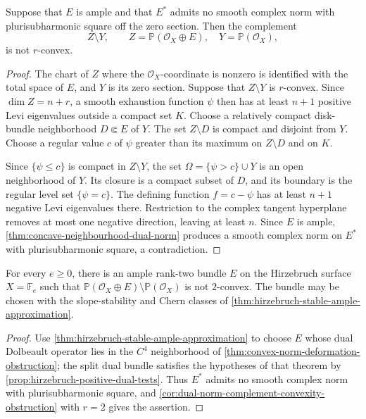 \begin{corollary}\label{cor:dual-norm-complement-convexity-obstruction}
Suppose that $E$ is ample and that $E^*$ admits no smooth complex norm with plurisubharmonic square off the zero section. Then the complement
\[
 Z\setminus Y,\qquad Z=\mathbb P(\mathcal O_X\oplus E),
 \quad Y=\mathbb P(\mathcal O_X),
\]
is not $r$-convex.
\end{corollary}
\begin{proof}
The chart of $Z$ where the $\mathcal O_X$-coordinate is nonzero is identified with the total space of $E$, and $Y$ is its zero section. Suppose that $Z\setminus Y$ is $r$-convex. Since $\dim Z=n+r$, a smooth exhaustion function $\psi$ then has at least $n+1$ positive Levi eigenvalues outside a compact set $K$. Choose a relatively compact disk-bundle neighborhood $D\Subset E$ of $Y$. The set $Z\setminus D$ is compact and disjoint from $Y$. Choose a regular value $c$ of $\psi$ greater than its maximum on $Z\setminus D$ and on $K$.

Since $\{\psi\leq c\}$ is compact in $Z\setminus Y$, the set $\Omega=\{\psi>c\}\cup Y$ is an open neighborhood of $Y$. Its closure is a compact subset of $D$, and its boundary is the regular level set $\{\psi=c\}$. The defining function $f=c-\psi$ has at least $n+1$ negative Levi eigenvalues there. Restriction to the complex tangent hyperplane removes at most one negative direction, leaving at least $n$. Since $E$ is ample, \cref{thm:concave-neighbourhood-dual-norm} produces a smooth complex norm on $E^*$ with plurisubharmonic square, a contradiction.
\end{proof}

\begin{corollary}\label{cor:hirzebruch-non-two-convex-complement}
For every $e\geq0$, there is an ample rank-two bundle $E$ on the Hirzebruch surface $X=\mathbb F_e$ such that $\mathbb P(\mathcal O_X\oplus E)\setminus\mathbb P(\mathcal O_X)$ is not $2$-convex. The bundle may be chosen with the slope-stability and Chern classes of \cref{thm:hirzebruch-stable-ample-approximation}.
\end{corollary}
\begin{proof}
Use \cref{thm:hirzebruch-stable-ample-approximation} to choose $E$ whose dual Dolbeault operator lies in the $C^4$ neighborhood of \cref{thm:convex-norm-deformation-obstruction}; the split dual bundle satisfies the hypotheses of that theorem by \cref{prop:hirzebruch-positive-dual-tests}. Thus $E^*$ admits no smooth complex norm with plurisubharmonic square, and \cref{cor:dual-norm-complement-convexity-obstruction} with $r=2$ gives the assertion.
\end{proof}
